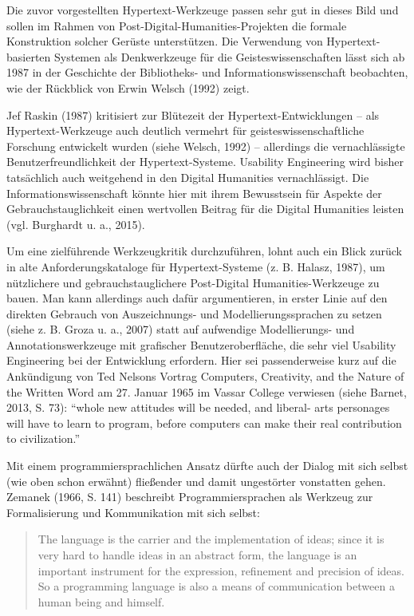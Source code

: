 \documentclass[a4paper,
fontsize=11pt,
oneside,
numbers=noperiodatend,
parskip=half-,
bibliography=totoc,
final
]{scrartcl}
\begin{document}
Die zuvor vorgestellten Hyper\-text-Werk\-zeug\-e passen sehr gut in dieses
Bild und sollen im Rahmen von Post-Digital-Humanities-Projekten die
formale Konstruktion solcher Gerüste unterstützen. Die Verwendung von
Hypertext- basierten Systemen als Denkwerkzeuge für die
Geisteswissenschaften lässt sich ab 1987 in der Geschichte der
Bibliotheks- und Informationswissenschaft beobachten, wie der Rückblick
von Erwin Welsch (1992) zeigt.

Jef Raskin (1987) kritisiert zur Blütezeit der Hypertext-Entwicklungen
-- als Hyper\-text-Werk\-zeug\-e auch deutlich vermehrt für
geisteswissenschaftliche Forschung entwickelt wurden (siehe Welsch,
1992) -- allerdings die vernachlässigte Benutzerfreundlichkeit der
Hypertext-Systeme. Usability Engineering wird bisher tatsächlich auch
weitgehend in den Digital Humanities vernachlässigt. Die
Informationswissenschaft könnte hier mit ihrem Bewusstsein für Aspekte
der Gebrauchstauglichkeit einen wertvollen Beitrag für die Digital
Humanities leisten (vgl. Burghardt u. a., 2015).

Um eine zielführende Werkzeugkritik durchzuführen, lohnt auch ein Blick
zurück in alte Anforderungskataloge für Hypertext-Systeme (z. B. Halasz,
1987), um nützlichere und gebrauchstauglichere Post-Digital
Humanities-Werkzeuge zu bauen. Man kann allerdings auch dafür
argumentieren, in erster Linie auf den direkten Gebrauch von
Auszeichnungs- und Modellierungssprachen zu setzen (siehe z. B. Groza u.
a., 2007) statt auf aufwendige Modellierungs- und Annotationswerkzeuge
mit grafischer Benutzeroberfläche, die sehr viel Usability Engineering
bei der Entwicklung erfordern. Hier sei passenderweise kurz auf die
Ankündigung von Ted Nelsons Vortrag Computers, Creativity, and the
Nature of the Written Word am 27. Januar 1965 im Vassar College
verwiesen (siehe Barnet, 2013, S. 73): \enquote{whole new attitudes will
be needed, and liberal- arts personages will have to learn to program,
before computers can make their real contribution to civilization.}

Mit einem programmiersprachlichen Ansatz dürfte auch der Dialog mit sich
selbst (wie oben schon erwähnt) fließender und damit ungestörter
vonstatten gehen. Zemanek (1966, S. 141) beschreibt Programmiersprachen
als Werkzeug zur Formalisierung und Kommunikation mit sich selbst:

\begin{quote}
The language is the carrier and the implementation of ideas; since it is
very hard to handle ideas in an abstract form, the language is an
important instrument for the expression, refinement and precision of
ideas. So a programming language is also a means of communication
between a human being and himself.
\end{quote}
\end{document}
